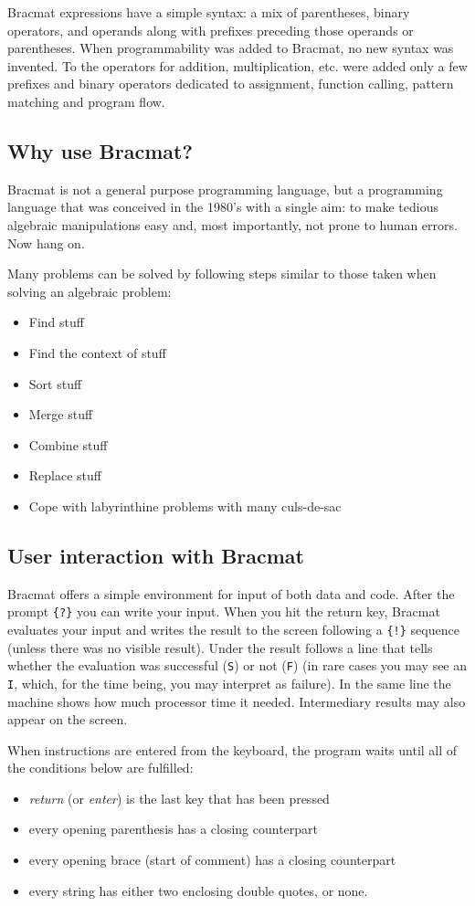 \documentclass[12pt]{article}
\begin{document}
Bracmat expressions have a simple syntax: a mix of parentheses, binary
operators, and operands along with prefixes preceding those operands
or parentheses. When programmability was added to Bracmat, no new syntax was invented. To the
operators for addition, multiplication, etc. were added only a few prefixes and binary 
operators dedicated to assignment, function calling, pattern matching and program flow.

\subsection{Why use Bracmat?}

Bracmat is not a general purpose programming language, but a
programming language that was conceived in the 1980's with a single
aim: to make tedious algebraic manipulations easy and, most
importantly, not prone to human errors. Now hang on.

Many problems can be solved by following steps similar to those taken when solving an algebraic problem:
\begin{itemize}
\item Find stuff
\item Find the context of stuff
\item Sort stuff
\item Merge stuff
\item Combine stuff
\item Replace stuff
\item Cope with labyrinthine problems with many culs-de-sac
\end{itemize}

\subsection{User interaction with Bracmat}

Bracmat offers a simple environment for input of both data and
code. After the prompt \verb|{?}| you can write your input. When you
hit the return key, Bracmat evaluates your input and writes the result
to the screen following a \verb|{!}| sequence (unless there was no
visible result). Under the result follows a line that tells whether
the evaluation was successful (\verb|S|) or not (\verb|F|) (in rare
cases you may see an \verb|I|, which, for the time being, you may
interpret as failure). In the same line the machine shows how much
processor time it needed. Intermediary results may also appear on the
screen.

When instructions are entered from the keyboard, the program waits
until all of the conditions below are fulfilled:
\begin{itemize}
\item \emph{return} (or \emph{enter}) is the last key that has been pressed
\item every opening parenthesis has a closing counterpart
\item every opening brace (start of comment) has a closing counterpart
\item every string has either two enclosing double quotes, or none.
\end{itemize}
\end{document}
